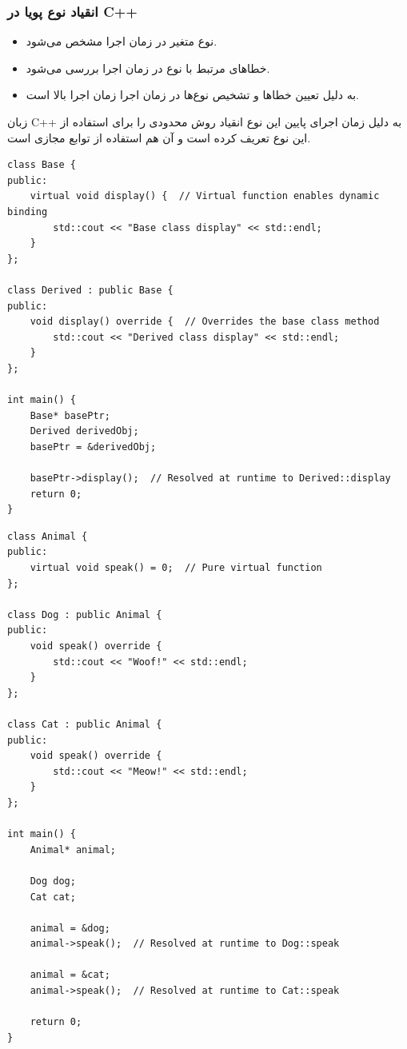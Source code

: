 \documentclass{article}
\begin{document}
\subsubsection*{انقیاد نوع پویا در C++}
\begin{itemize}
    \item نوع متغیر در زمان اجرا مشخص می‌شود.
    \item خطاهای مرتبط با نوع در زمان اجرا بررسی می‌شود.
    \item به دلیل تعیین خطاها و تشخیص نوع‌ها در زمان اجرا زمان اجرا بالا است.
\end{itemize}

زبان C++ به دلیل زمان اجرای پایین این نوع انقیاد روش‌ محدودی را برای استفاده از این نوع تعریف کرده است و آن هم استفاده از توابع مجازی است.

\begin{LTR} %
\begin{lstlisting}
class Base {
public:
    virtual void display() {  // Virtual function enables dynamic binding
        std::cout << "Base class display" << std::endl;
    }
};

class Derived : public Base {
public:
    void display() override {  // Overrides the base class method
        std::cout << "Derived class display" << std::endl;
    }
};

int main() {
    Base* basePtr;
    Derived derivedObj;
    basePtr = &derivedObj;

    basePtr->display();  // Resolved at runtime to Derived::display
    return 0;
}
\end{lstlisting}
\end{LTR}


\begin{LTR} %
\begin{lstlisting}
class Animal {
public:
    virtual void speak() = 0;  // Pure virtual function
};

class Dog : public Animal {
public:
    void speak() override {
        std::cout << "Woof!" << std::endl;
    }
};

class Cat : public Animal {
public:
    void speak() override {
        std::cout << "Meow!" << std::endl;
    }
};

int main() {
    Animal* animal;

    Dog dog;
    Cat cat;

    animal = &dog;
    animal->speak();  // Resolved at runtime to Dog::speak

    animal = &cat;
    animal->speak();  // Resolved at runtime to Cat::speak

    return 0;
}	
\end{lstlisting}
\end{LTR}
\end{document}
